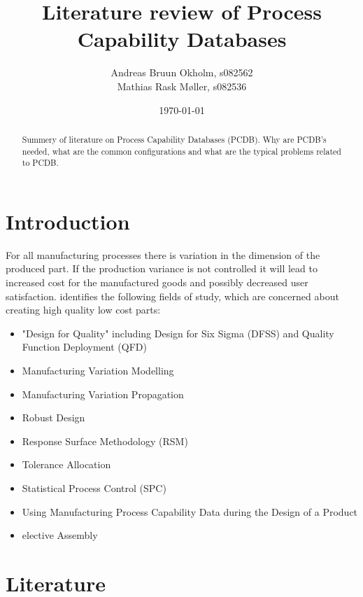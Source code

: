 \documentclass[aip,amsmath,reprint, author-year]{revtex4-1}
\begin{document}
\begin{abstract}
Summery of literature on Process Capability Databases (PCDB). Why are PCDB's needed, what are the common configurations and what are the typical problems related to PCDB.
\end{abstract}

\title{Literature review of Process Capability Databases}
\author{Andreas Bruun Okholm, s082562\\
Mathias Rask Møller, s082536 }  
 
\date{\today}
\maketitle


\section{Introduction}
For all manufacturing processes there is variation in the dimension of the produced part. 
If the production variance is not controlled it will lead to increased cost for the manufactured goods and possibly decreased user satisfaction.
\citet{kern2003forecasting} identifies the following fields of study, which are concerned about creating high quality low cost parts: 
\begin{itemize}
\item "Design for Quality" including Design for Six Sigma (DFSS) and Quality Function Deployment (QFD)
\item Manufacturing Variation Modelling
\item Manufacturing Variation Propagation
\item Robust Design
\item Response Surface Methodology (RSM)
\item Tolerance Allocation
\item Statistical Process Control (SPC)
\item Using Manufacturing Process Capability Data during the Design of a Product
\item elective Assembly
\end{itemize}

\section{Literature}
\end{document}
